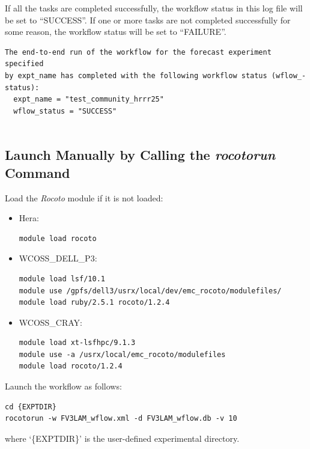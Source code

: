 \documentclass[11pt,fleqn]{report}              %
\begin{document}
If all the tasks are completed successfully, the workflow status in this log file will be set to ``SUCCESS''. If one or more tasks are not completed successfully for some reason, the workflow status will be set to ``FAILURE''.

\lstset{language=bash}   
\begin{lstlisting}[frame=trBL]
The end-to-end run of the workflow for the forecast experiment specified 
by expt_name has completed with the following workflow status (wflow_-
status):
  expt_name = "test_community_hrrr25"
  wflow_status = "SUCCESS"
  
\end{lstlisting}



\subsection{Launch Manually by Calling the {\it rocotorun} Command}
\label{subsec:launch_manual}

Load the {\it Rocoto} module if it is not loaded:
\begin{itemize}
\item Hera:
\lstset{language=bash}   
\begin{lstlisting}[frame=trBL]
module load rocoto
\end{lstlisting}

\item WCOSS\_DELL\_P3:
\lstset{language=bash}   
\begin{lstlisting}[frame=trBL]
module load lsf/10.1
module use /gpfs/dell3/usrx/local/dev/emc_rocoto/modulefiles/
module load ruby/2.5.1 rocoto/1.2.4
\end{lstlisting}

\item WCOSS\_CRAY:
\lstset{language=bash}   
\begin{lstlisting}[frame=trBL]
module load xt-lsfhpc/9.1.3
module use -a /usrx/local/emc_rocoto/modulefiles
module load rocoto/1.2.4
\end{lstlisting}

\end{itemize}


Launch the workflow as follows:
\lstset{language=bash}   
\begin{lstlisting}[frame=trBL]
cd {EXPTDIR}
rocotorun -w FV3LAM_wflow.xml -d FV3LAM_wflow.db -v 10
\end{lstlisting}
where `\{EXPTDIR\}' is the user-defined experimental directory. \\
\end{document}
